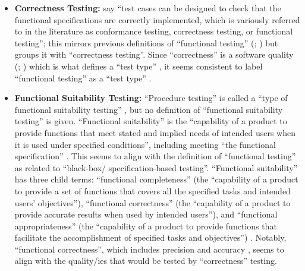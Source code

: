 \begin{itemize}
      \item \textbf{Correctness Testing:} \citet[p.~86]{SWEBOK2014} say
            ``test cases can be designed to check that the functional
            specifications are correctly implemented, which is variously
            referred to in the literature as conformance testing, correctness
            testing, or functional testing''; this mirrors previous definitions
            of ``functional testing'' (\citealp[p.~21]{IEEE2022};
            \citeyear[p.~196]{IEEE2017}) but groups it with ``correctness
            testing''. Since ``correctness'' is a software quality
            (\citealp[p.~104]{IEEE2017}; \citealp[p.~57]{SWEBOK2014}) which is
            what defines a ``test type'' \cite[p.~15]{IEEE2022}, it seems
            consistent to label ``functional testing'' as a ``test type''
            \cite[pp.~15, 20, 22]{IEEE2022}.

      \item \textbf{Functional Suitability Testing:} ``Procedure testing'' is
            called a ``type of functional suitability testing''
            \citep[p.~7]{IEEE2022}, but no definition of ``functional
            suitability testing'' is given. ``Functional suitability'' is the
            ``capability of a product to provide functions that meet stated and
            implied needs of intended users when it is used under specified
            conditions'', including meeting ``the functional specification''
            \citep{ISO_IEC2023a}. This seems to align with the definition of
            ``functional testing'' as related to ``black-box/
            specification-based testing''. ``Functional suitability'' has
            three child terms: ``functional completeness'' (the ``capability of
            a product to provide a set of functions that covers all the
            specified tasks and intended users' objectives''), ``functional
            correctness'' (the ``capability of a product to provide accurate
            results when used by intended users''), and ``functional
            appropriateness'' (the ``capability of a product to provide
            functions that facilitate the accomplishment of specified tasks and
            objectives'') \citep{ISO_IEC2023a}. Notably, ``functional
            correctness'', which includes precision and accuracy
            \citep{ISO_IEC2023a, ISTQB}, seems to align with the quality/ies
            that would be tested by ``correctness'' testing.
\end{itemize}


